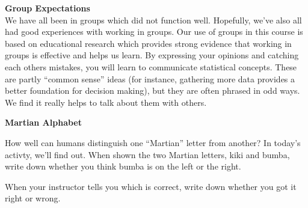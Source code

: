 
 {\bf Group Expectations }\\
 We have all been in groups which did not function well.  Hopefully,
 we've also all had good experiences with working in groups.  Our use
 of groups in this course is based on educational research which
 provides strong evidence that working in groups is effective and helps
 us learn.  By expressing your opinions and catching each others
 mistakes, you will learn to communicate statistical concepts.  These
 are partly ``common sense''
 ideas (for instance, gathering more data provides a better foundation
 for decision making),  but they are often  phrased in
 odd ways. We find it really helps to talk about them  with
 others. 



\newpage
 \def\theTopic{Martian Alphabet}

\begin{center}
{\bf  Martian Alphabet }\\
\end{center}
\vspace{-.2in}

How well can humans distinguish one ``Martian'' letter from another?
In today's activty, we'll find out.
When shown the two Martian letters, kiki and bumba, write down whether
you think bumba is on the left or the right. \vspace{.5cm}


When your instructor  tells you which is correct, write down whether
you got it right or wrong. \vspace{.5cm}


